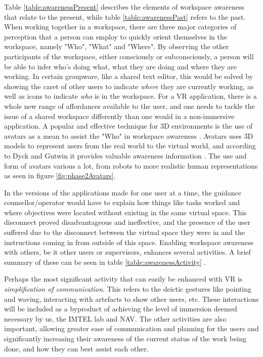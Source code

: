Table \ref{table:awarenessPresent} describes the elements of workspace awareness that relate to the present, while table \ref{table:awarenessPast} refers to the past. When working together in a workspace, there are three major categories of perception that a person can employ to quickly orient themselves in the workspace, namely "Who", "What" and "Where". By observing the other participants of the workspace, either consciously or subconsciously, a person will be able to infer who's doing what, what they are doing and where they are working. In certain groupware, like a shared text editor, this would be solved by showing the caret of other users to indicate \textit{where} they are currently working, as well as icons to indicate \textit{who} is in the workspace. For a VR application, there is a whole new range of affordances available to the user, and one needs to tackle the issue of a shared workspace differently than one would in a non-immersive application.
A popular and effective technique for 3D environments is the use of avatars as a mean to assist the "Who" in workspace awareness \cite{benford1995user}. Avatars uses 3D models to represent users from the real world to the virtual world, and according to Dyck and Gutwin it provides valuable awareness information \cite{dyck2002groupspace}. The use and form of avatars various a lot, from robots to more realistic human representations as seen in figure \ref{fig:phase2Avatars}. 


In the versions of the applications made for one user at a time, the guidance counsellor/operator would have to explain how things like tasks worked and where objectives were located without existing in the same virtual space. This disconnect proved disadvantageous and ineffective, and the presence of the user suffered due to the disconnect between the virtual space they were in and the instructions coming in from outside of this space. Enabling workspace awareness with others, be it other users or supervisors, enhances several activities. A brief summary of these can be seen in table \ref{table:awarenessActivity} \cite{gutwin2002descriptive}. 

Perhaps the most significant activity that can easily be enhanced with VR is \textit{simplification of communication}. This refers to the deictic gestures like pointing and waving, interacting with artefacts to show other users, etc. These interactions will be included as a byproduct of achieving the level of immersion deemed necessary by us, the IMTEL lab and NAV. The other activities are also important, allowing greater ease of communication and planning for the users and significantly increasing their awareness of the current status of the work being done, and how they can best assist each other.

